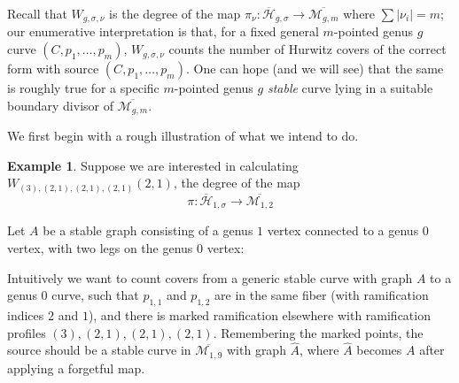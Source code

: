 \documentclass[11pt]{article}           %
\newcommand{\Hb}{\overline{\mathcal H}}
\theoremstyle{definition}
\newtheorem{eg}{Example}[section]
\begin{document}
Recall that $W_{g,\sigma,\nu}$ is the degree of the map $\pi_{\nu}:\Hb_{g,\sigma}\to\overline{\mathcal M_{g,m}}$
where $\sum|\nu_i|=m$; our enumerative interpretation is that, for a fixed general $m$-pointed genus $g$ curve $(C,p_1,\dots,p_m)$, $W_{g,\sigma,\nu}$ counts the number of Hurwitz covers of the correct form with source $(C,p_1,\dots,p_m)$. One can hope (and we will see) that the same is roughly true for
a specific $m$-pointed genus $g$ {\it stable} curve lying in a suitable boundary divisor of $\overline{\mathcal M_{g,m}}$.

We first begin with a rough illustration of what we intend to do.

\begin{eg}
  Suppose we are interested in calculating $W_{(3),(2,1),(2,1),(2,1)}(2,1)$, the degree of the map
  \[
  \pi:\Hb_{1,\sigma}\to\overline{\mathcal M_{1,2}}
  \]
  
  Let $A$ be a stable graph consisting of a genus $1$ vertex connected to a genus $0$ vertex, with two legs on the
  genus $0$ vertex:

  

  Intuitively we want to count covers from a generic stable curve with graph $A$ to a genus $0$
  curve, such that $p_{1,1}$ and $p_{1,2}$ are in the same fiber (with ramification indices $2$ and $1$),
  and there is marked ramification elsewhere with ramification profiles $(3),(2,1),(2,1),(2,1)$.
  Remembering the marked points, the source should be a stable curve in $\overline{\mathcal M_{1,9}}$ with graph $\hat A$, where $\hat A$
  becomes $A$ after applying a forgetful map.


\end{eg}
\end{document}
